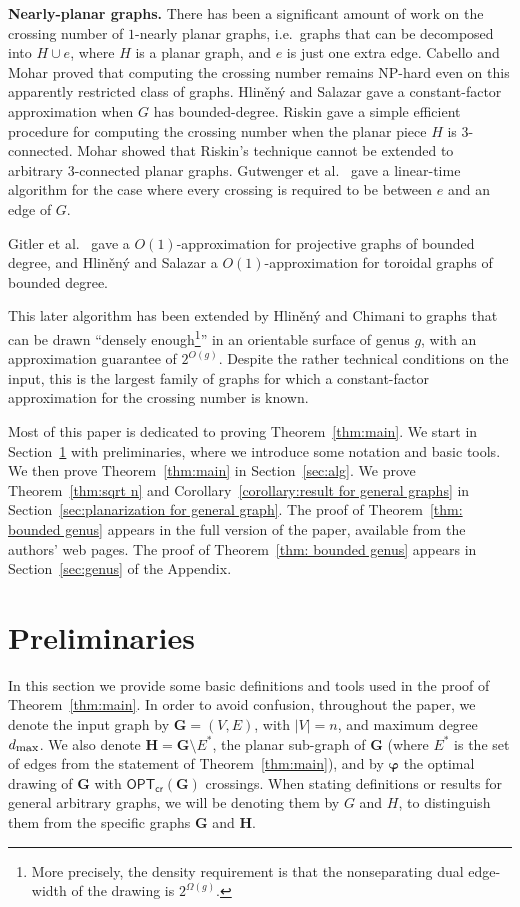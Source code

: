 \documentclass[twoside,leqno,twocolumn]{article}
\newcommand{\optcro}[1]{\mathsf{OPT}_{\mathsf{cr}}(#1)}
\newcommand{\dmax}{d_{\mbox{\textup{\footnotesize{max}}}}}
\newcommand{\G}{{\mathbf{G}}}
\renewcommand{\H}{{\mathbf{H}}}
\newcommand{\bphi}{{\boldsymbol{\varphi}}}
\begin{document}
\textbf{Nearly-planar graphs.}
There has been a significant amount of work on the crossing number of $1$-nearly planar graphs, i.e.~graphs that can be decomposed into $H\cup e$, where $H$ is a planar graph, and $e$ is just one extra edge.
Cabello and Mohar \cite{cabello_edge} proved that computing the crossing number remains NP-hard even on this apparently restricted class of graphs.
Hlin\v{e}n\'{y} and Salazar \cite{HlinenyS06} gave a constant-factor approximation when $G$ has bounded-degree.
Riskin \cite{riskin_edge} gave a simple efficient procedure for computing the crossing number when the planar piece $H$ is 3-connected.
Mohar \cite{Mohar_almost} showed that Riskin's technique cannot be extended to arbitrary 3-connected planar graphs.
Gutwenger et al.~\cite{GutwengerMW05} gave a linear-time algorithm for the case where every crossing is required to be between $e$ and an edge of $G$.




Gitler et al.~\cite{crossing_projective} gave a $O(1)$-approximation for projective graphs of bounded degree, and Hlin\v{e}n\'{y} and Salazar \cite{crossing_torus} a
$O(1)$-approximation for toroidal graphs of bounded degree.

This later algorithm has been extended by Hlin\v{e}n\'{y} and Chimani \cite{crossing_genus} to graphs that can be drawn ``densely enough\footnote{More precisely, the density requirement is that the nonseparating dual edge-width of the drawing is $2^{\Omega(g)}$.}'' in an orientable surface of genus $g$,
with an approximation guarantee of $2^{O(g)}$.
Despite the rather technical conditions on the input, this is the largest family of graphs for which a constant-factor approximation for the crossing number is known.
\fi

 Most of this paper is dedicated to proving Theorem~\ref{thm:main}. We start in Section~\ref{sec:prelims} with preliminaries, where we introduce some notation and basic tools. We then prove Theorem~\ref{thm:main} in Section~\ref{sec:alg}. We prove Theorem~\ref{thm:sqrt n} and Corollary~\ref{corollary:result for general graphs} in Section~\ref{sec:planarization for general graph}. 
\ifabstract
The proof of Theorem~\ref{thm: bounded genus} appears in the full version of the paper, available from the authors' web pages.
\fi
\iffull 
The proof of Theorem~\ref{thm: bounded genus} appears in Section~\ref{sec:genus} of the Appendix.
\fi

\section{Preliminaries}\label{sec:prelims}
In this section we provide some basic definitions and tools used in the proof of Theorem~\ref{thm:main}. In order to avoid confusion, throughout the paper, we denote the input graph by $\G=(V,E)$, with $|V|=n$, and maximum degree $\dmax$. We also denote $\H=\G\setminus E^*$, the planar sub-graph of $\G$ (where $E^*$ is the set of edges from the statement of Theorem~\ref{thm:main}), and by $\bphi$ the optimal drawing of $\G$ with $\optcro{\G}$ crossings. When stating definitions or results for general arbitrary graphs, we will be denoting them by $G$ and $H$, to distinguish them from the specific graphs $\G$ and $\H$. 
\end{document}
